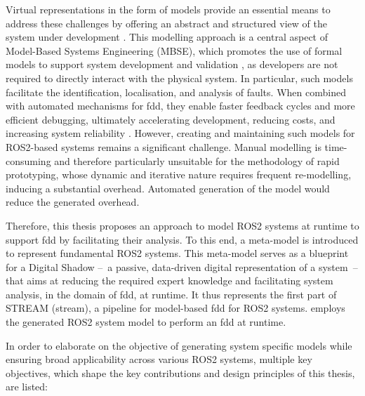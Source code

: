 Virtual representations in the form of models provide an essential means to address these challenges by offering an abstract and structured view of the system under development \cite{MBSEemergingApproach}. This modelling approach is a central aspect of Model-Based Systems Engineering (MBSE), which promotes the use of formal models to support system development and validation \cite[p.~105]{MBSEemergingApproach}, as developers are not required to directly interact with the physical system. In particular, such models facilitate the identification, localisation, and analysis of faults. When combined with automated mechanisms for \acl{fdd}, they enable faster feedback cycles and more efficient debugging, ultimately accelerating development, reducing costs, and increasing system reliability \cite[p.~1]{accelerateDevelopmentCycles}. However, creating and maintaining such models for ROS2-based systems remains a significant challenge. Manual modelling is time-consuming and therefore particularly unsuitable for the methodology of rapid prototyping, whose dynamic and iterative nature requires frequent re-modelling, inducing a substantial overhead. Automated generation of the model would reduce the generated overhead.

Therefore, this thesis proposes an approach to model ROS2 systems at runtime to support \acl{fdd} by facilitating their analysis. To this end, a meta-model is introduced to represent fundamental ROS2 systems. This meta-model serves as a blueprint for a Digital Shadow --~a passive, data-driven digital representation of a system~-- that aims at reducing the required expert knowledge and facilitating system analysis, in the domain of \acl{fdd}, at runtime. It thus represents the first part of STREAM (\acl{stream}), a pipeline for model-based \acl{fdd} for ROS2 systems. \Textcite{jkohl2025} employs the generated ROS2 system model to perform an \acl{fdd} at runtime.

In order to elaborate on the objective of generating system specific models while ensuring broad applicability across various ROS2 systems, multiple key objectives, which shape the key contributions and design principles of this thesis, are listed:

